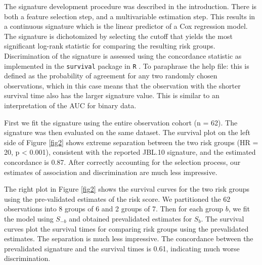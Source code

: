 \documentclass[11pt,]{article}
\begin{document}
The signature development procedure was described in the introduction.
There is both a feature selection step, and a multivariable estimation
step. This results in a continuous signature which is the linear
predictor of a Cox regression model. The signature is dichotomized by
selecting the cutoff that yields the most significant log-rank statistic
for comparing the resulting risk groups. Discrimination of the signature
is assessed using the concordance statistic as implemented in the
\texttt{survival} package in \texttt{R} \citep{survival}. To paraphrase
the help file: this is defined as the probability of agreement for any
two randomly chosen observations, which in this case means that the
observation with the shorter survival time also has the larger signature
value. This is similar to an interpretation of the AUC for binary data.

First we fit the signature using the entire observation cohort (n = 62).
The signature was then evaluated on the same dataset. The survival plot
on the left side of Figure \ref{fig2} shows extreme separation between
the two risk groups (HR = 20, p \textless{} 0.001), consistent with the
reported JBL.10 signature, and the estimated concordance is 0.87. After
correctly accounting for the selection process, our estimates of
association and discrimination are much less impressive.

The right plot in Figure \ref{fig2} shows the survival curves for the
two risk groups using the pre-validated estimates of the risk score. We
partitioned the 62 observations into 8 groups of 6 and 2 groups of 7.
Then for each group \(b\), we fit the model using \(S_{-b}\) and
obtained prevalidated estimates for \(S_{b}\). The survival curves plot
the survival times for comparing risk groups using the prevalidated
estimates. The separation is much less impressive. The concordance
between the prevalidated signature and the survival times is 0.61,
indicating much worse discrimination.
\end{document}
